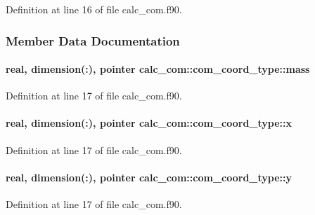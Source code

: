 Definition at line 16 of file calc\-\_\-com.\-f90.



\subsubsection{Member Data Documentation}
\hypertarget{structcalc__com_1_1com__coord__type_ae60027dd2b949a9eb83f4e4a4e351844}{
\paragraph[{mass}]{\setlength{\rightskip}{0pt plus 5cm}real, dimension(\-:), pointer calc\-\_\-com\-::com\-\_\-coord\-\_\-type\-::mass}}\label{structcalc__com_1_1com__coord__type_ae60027dd2b949a9eb83f4e4a4e351844}


Definition at line 17 of file calc\-\_\-com.\-f90.

\hypertarget{structcalc__com_1_1com__coord__type_a49ea4855283823674030d9aa646af021}{
\paragraph[{x}]{\setlength{\rightskip}{0pt plus 5cm}real, dimension(\-:), pointer calc\-\_\-com\-::com\-\_\-coord\-\_\-type\-::x}}\label{structcalc__com_1_1com__coord__type_a49ea4855283823674030d9aa646af021}


Definition at line 17 of file calc\-\_\-com.\-f90.

\hypertarget{structcalc__com_1_1com__coord__type_aeb14c59fa53674fda40bf26a1826e6b7}{
\paragraph[{y}]{\setlength{\rightskip}{0pt plus 5cm}real, dimension(\-:), pointer calc\-\_\-com\-::com\-\_\-coord\-\_\-type\-::y}}\label{structcalc__com_1_1com__coord__type_aeb14c59fa53674fda40bf26a1826e6b7}


Definition at line 17 of file calc\-\_\-com.\-f90.

